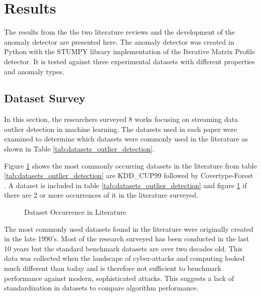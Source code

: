 \section{Results}
\label{ref_results}

The results from the the two literature reviews and the development of the anomaly detector are presented here. The anomaly detector was created in Python with the STUMPY library implementation of the Iterative Matrix Profile detector. It is tested against three experimental datasets with different properties and anomaly types. 

\subsection{Dataset Survey}
\label{ref_dataset_survey}

In this section, the researchers surveyed 8 works focusing on streaming data outlier detection in machine learning. The datasets used in each paper were examined to determine which datasets were commonly used in the literature as shown in Table \ref{tab:datasets_outlier_detection}. 



Figure \ref{fig_dataset_lit} shows the most commonly occurring datasets in the literature from table \ref{tab:datasets_outlier_detection} are KDD\_CUP99 \parencite{kdd1999} followed by Covertype-Forest \parencite{covertype-dataset}. A dataset is included in table \ref{tab:datasets_outlier_detection} and figure \ref{fig_dataset_lit} if there are 2 or more occurrences of it in the literature surveyed.

\begin{figure}[H]
    \caption{Dataset Occurrence in Literature }
    \label{fig_dataset_lit}
\end{figure}


The most commonly used datasets found in the literature were originally created in the late 1990's. Most of the research surveyed has been conducted in the last 10 years but the standard benchmark datasets are over two decades old. This data was collected when the landscape of cyber-attacks and computing looked much different than today and is therefore not sufficient to benchmark performance against modern, sophisticated attacks. This suggests a lack of standardization in datasets to compare algorithm performance.


